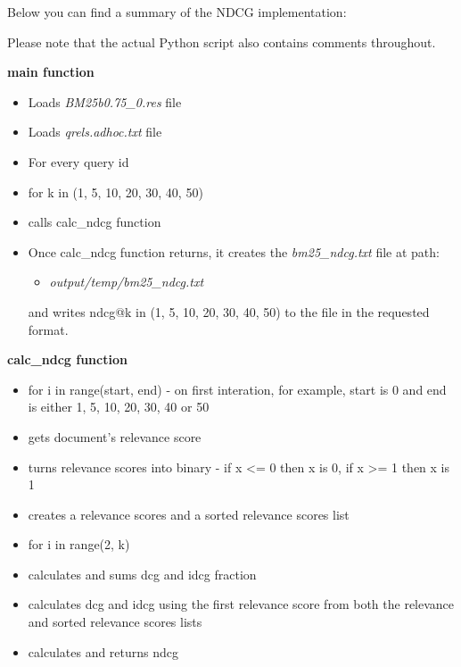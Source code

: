 \documentclass{article} %
\begin{document}
Below you can find a summary of the NDCG implementation:

Please note that the actual Python script also contains comments throughout.

\textbf{main function}

\begin{itemize}
    \item Loads \textit{BM25b0.75\_0.res} file
    \item Loads \textit{qrels.adhoc.txt} file
    \item For every query id
    \item for k in (1, 5, 10, 20, 30, 40, 50)
    \item calls calc\_ndcg function
    \item Once calc\_ndcg function returns, it creates the \textit{bm25\_ndcg.txt} file at path:   
    \begin{itemize}
        \item \textit{output/temp/bm25\_ndcg.txt}
    \end{itemize}
    and writes ndcg@k in (1, 5, 10, 20, 30, 40, 50) to the file in the requested format.
\end{itemize}

\textbf{calc\_ndcg function}

\begin{itemize}
    \item for i in range(start, end) - on first interation, for example, start is 0 and end is either 1, 5, 10, 20, 30, 40 or 50
    \item gets document's relevance score
    \item turns relevance scores into binary - if x \textless= 0 then x is 0, if x \textgreater= 1 then x is 1
    \item creates a relevance scores and a sorted relevance scores list
    \item for i in range(2, k)
    \item calculates and sums dcg and idcg fraction
    \item calculates dcg and idcg using the first relevance score from both the relevance and sorted relevance scores lists
    \item calculates and returns ndcg
\end{itemize}
\end{document}
